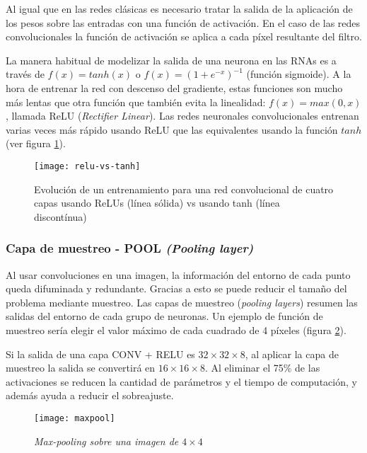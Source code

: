 Al igual que en las redes clásicas es necesario tratar la salida de la
aplicación de los pesos sobre las entradas con una función de activación. En el
caso de las redes convolucionales la función de activación se aplica a cada
píxel resultante del filtro.

La manera habitual de modelizar la salida de una neurona en las RNAs es a
través de $f(x) = tanh(x)$ o $f(x) = (1 + e^{-x})^{-1}$ (función sigmoide). A
la hora de entrenar la red con descenso del gradiente, estas funciones son
mucho más lentas que otra función que también evita la linealidad: $f(x) =
max(0, x)$, llamada ReLU (\textit{Rectifier Linear}). Las redes neuronales
convolucionales entrenan varias veces más rápido usando ReLU  que las
equivalentes usando la función $tanh$ (ver figura \ref{relu-vs-tanh}).

\begin{figure}
    \centering
    \caption{Evolución de un entrenamiento para una red convolucional de cuatro capas usando ReLUs (línea sólida) vs usando tanh (línea discontínua) \parencite{krizhevsky2012imagenet}}
  \label{relu-vs-tanh}
  \texttt{[image: relu-vs-tanh]}
\end{figure}

\subsubsection{Capa de muestreo - POOL \textit{(Pooling layer)}}

Al usar convoluciones en una imagen, la información del entorno de cada punto
queda difuminada y redundante. Gracias a esto se puede reducir el tamaño del
problema mediante muestreo. Las capas de muestreo (\textit{pooling layers})
resumen las salidas del entorno de cada grupo de neuronas. Un ejemplo de
función de muestreo sería elegir el valor máximo de cada cuadrado de 4 píxeles
(figura \ref{maxpool}).

Si la salida de una capa CONV + RELU es $32 \times 32 \times 8$, al aplicar la capa de muestreo la salida se convertirá en $16 \times 16 \times 8$. Al eliminar el 75\% de las activaciones se reducen la cantidad de parámetros y el tiempo de computación, y además ayuda a reducir el sobreajuste.

\begin{figure}
    \centering
    \caption{\textit{Max-pooling sobre una imagen de $4\times4$}}
  \label{maxpool}
  \texttt{[image: maxpool]}
\end{figure}

